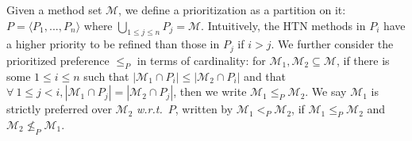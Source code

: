 \documentclass[letterpaper]{article} %
\newtheorem{definition}{Definition}
\newcommand{\Methods}{\mathcal{M}}
\newcommand{\prefer}{\leq_P}
\begin{document}
Given a method set $\Methods$, we define a prioritization as a partition on it: $P {=} \langle P_1,...,P_n \rangle$ where $\bigcup_{1\leq j \leq n} P_j =\Methods$. %
Intuitively, the HTN methods in $P_i$ have a higher priority to be refined than those in $P_j$ if $i > j$.
We further consider the prioritized preference $\leq_P$ in terms of cardinality: %
%
for $\Methods_1,\Methods_2\subseteq \Methods$,
if %
there is some $1 \!\leq i\! \leq n$ such that
$|\Methods_1 \!\cap\! P_i| \!\leq\! |\Methods_2 \!\cap\! P_i|$ and that
$\forall\ 1 \!\leq\! j \!<\! i,  |\Methods_1 \!\cap\! P_j| \!=\! |\Methods_2 \!\cap\! P_j|$,
then we write $\Methods_1 \!\leq_P\! \Methods_2$.
We say $\Methods_1$ is strictly preferred over $\Methods_2$ \emph{w.r.t.}\ $P$, written by $\Methods_1 \!<_P\! \Methods_2$, if $\Methods_1 \!\prefer\! \Methods_2$ and $\Methods_2 \!\not\prefer\! \Methods_1$.
\end{document}
